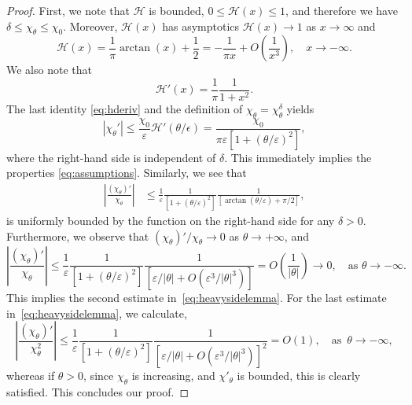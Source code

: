 \documentclass[10pt,a4paper]{amsart}
\begin{document}
\begin{proof}
First, we note that $\mathcal{H}$ is bounded, $0\le \mathcal{H}(x) \le 1$, and therefore we have $\delta \le \chi_\theta \le \chi_0$. Moreover, $\mathcal{H}(x)$ has asymptotics $\mathcal{H}(x) \to 1$ as $x\to \infty$ and 
\begin{equation}
\label{eq:asymp-inf}
\mathcal{H}(x) = \frac{1}{\pi} \arctan(x) + \frac{1}{2} 
= - \frac{1}{\pi x} + O\left(\frac{1}{x^3}\right), \quad x\to -\infty.
\end{equation}
We also note that
\begin{equation}
\label{eq:hderiv}
\mathcal{H}'(x) = \frac{1}{\pi} \frac{1}{1+x^2}.
\end{equation}
The last identity \eqref{eq:hderiv} and the definition of $\chi_\theta = \chi^\delta_\theta$ yields
\[
|\chi_\theta'| 
\le \frac{\chi_0}{\varepsilon} \mathcal{H}'(\theta/\epsilon)
= \frac{\chi_0}{\pi\varepsilon \left[1+(\theta/\varepsilon)^2\right]},
\]
where the right-hand side is independent of $\delta$. This immediately implies the properties \eqref{eq:assumptions}. Similarly, we see that
\begin{align*}
\left|
\frac{(\chi_{\theta})'}{\chi_{\theta}}
\right|
&\le
 \frac{1}{\varepsilon} \frac{1}{\left[ 1+(\theta/\varepsilon)^2 \right]} \frac{1}{\left[\arctan(\theta/\varepsilon) + \pi/2\right]},
\end{align*}
is uniformly bounded by the function on the right-hand side for any $\delta>0$. Furthermore, we observe that $(\chi_\theta)'/\chi_\theta \to 0$ as $\theta \to +\infty$, and
\[
\left|
\frac{(\chi_{\theta})'}{\chi_{\theta}}
\right|
\le \frac{1}{\varepsilon}  \frac{1}{\left[ 1+(\theta/\varepsilon)^2 \right]} \frac{1}{\left[\varepsilon/|\theta| + O(\varepsilon^3/|\theta|^3)\right]} 
= 
O\left( \frac{1}{|\theta|} \right)
\to 0, \quad \text{as } \theta \to -\infty.
\]
This implies the second estimate in~\eqref{eq:heavysidelemma}.
For the last estimate in~\eqref{eq:heavysidelemma}, we calculate,
\[
\left|
\frac{(\chi_{\theta})'}{\chi_{\theta}^2}
\right|
\le \frac{1}{\varepsilon}  \frac{1}{\left[ 1+(\theta/\varepsilon)^2 \right]} \frac{1}{\left[\varepsilon/|\theta| + O(\varepsilon^3/|\theta|^3)\right]^2} 
= 
O\left( 1 \right),\quad \text{as } \, \theta\to-\infty,
\]
whereas if $\theta>0$, since $\chi_\theta$ is increasing, and $\chi'_\theta$ is bounded, this is clearly satisfied.
This concludes our proof.
\end{proof}
\end{document}
